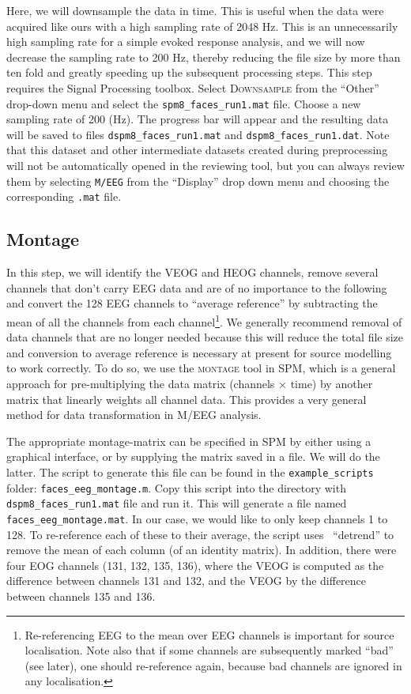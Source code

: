 Here, we will downsample the data in time. This is useful when the data were acquired like ours with a high sampling rate of 2048 Hz. This is an unnecessarily high sampling rate for a simple evoked response analysis, and we will now decrease the sampling rate to 200 Hz, thereby reducing the file size by more than ten fold and greatly speeding up the subsequent processing steps. This step requires the Signal Processing toolbox. Select \textsc{Downsample} from the ``Other'' drop-down menu and select the \texttt{spm8\_faces\_run1.mat} file. Choose a new sampling rate of 200 (Hz). The progress bar will appear and the resulting data will be saved to files \texttt{dspm8\_faces\_run1.mat} and \texttt{dspm8\_faces\_run1.dat}. Note that this dataset and other intermediate datasets created during preprocessing will not be automatically opened in the reviewing tool, but you can always review them by selecting \texttt{M/EEG} from the ``Display'' drop down menu and choosing the corresponding \texttt{.mat} file.

\subsection{Montage}

In this step, we will identify the VEOG and HEOG channels, remove several channels that don't carry EEG data and are of no importance to the following and convert the 128 EEG channels to ``average reference'' by subtracting the mean of all the channels from each channel\footnote{Re-referencing EEG to the mean over EEG channels is important for source localisation. Note also that if some channels are subsequently marked ``bad'' (see later), one should re-reference again, because bad channels are ignored in any localisation.}. We generally recommend removal of data channels that are no longer needed because this will reduce the total file size and conversion to average reference is necessary at present for source modelling to work correctly. To do so, we use the \textsc{montage} tool in SPM, which is a general approach for pre-multiplying the data matrix (channels $\times$ time) by another matrix that linearly weights all channel data. This provides a very general method for data transformation in M/EEG analysis.

The appropriate montage-matrix can be specified in SPM by either using a graphical interface, or by supplying the matrix saved in a file. We will do the latter. The script to generate this file can be found in the \texttt{example\_scripts} folder: \texttt{faces\_eeg\_montage.m}. Copy this script into the directory with \texttt{dspm8\_faces\_run1.mat} file and run it. This will generate a file named \texttt{faces\_eeg\_montage.mat}. In our case, we would like to only keep channels 1 to 128. To re-reference each of these to their average, the script uses \matlab\ ``detrend'' to remove the mean of each column (of an identity matrix). In addition, there were four EOG channels (131, 132, 135, 136), where the VEOG is computed as the difference between channels 131 and 132, and the VEOG by the difference between channels 135 and 136. 

